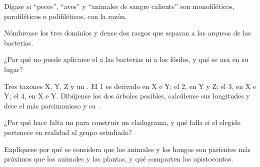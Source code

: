 \begin{exercise}[$\star$]\label{exo:b1:classifying-biodiversity:3}
Dígase si ``peces'', ``aves'' y ``animales de sangre caliente'' son
monofiléticos, parafiléticos o polifiléticos, con la razón.
\end{exercise}

\begin{exercise}[$\star$]\label{exo:b1:classifying-biodiversity:4}
Nómbrense los tres dominios y dense dos rasgos que separan a las arqueas de
las bacterias.
\end{exercise}

\begin{exercise}[$\star\star$]\label{exo:b1:classifying-biodiversity:5}
¿Por qué no puede aplicarse el  a las bacterias
ni a los fósiles, y qué se usa en su lugar?
\end{exercise}

\begin{exercise}[$\star\star$]\label{exo:b1:classifying-biodiversity:6}
Tres taxones X, Y, Z y un . El  1 es derivado en X e Y;
el  2, en Y y Z; el  3, en X e Y; el  4, en X e Y.
Dibújense los dos árboles posibles, calcúlense sus longitudes y dese el más
parsimonioso y su .
\end{exercise}

\begin{exercise}[$\star\star$]\label{exo:b1:classifying-biodiversity:7}
¿Por qué hace falta un  para construir un cladograma, y qué
falla si el  elegido pertenece en realidad al grupo estudiado?
\end{exercise}

\begin{exercise}[$\star\star$]\label{exo:b1:classifying-biodiversity:8}
Explíquese por qué se considera que los animales y los hongos son parientes
más próximos que los animales y las plantas, y qué  comparten los
opistocontos.
\end{exercise}

